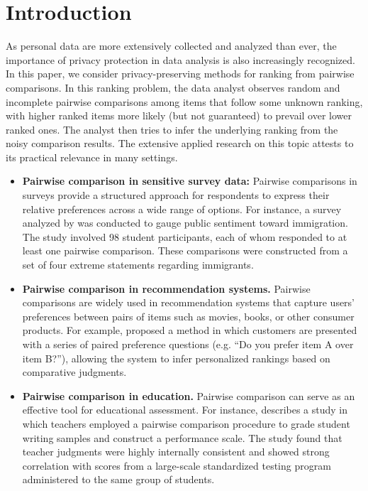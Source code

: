 \documentclass[letterpaper,12pt]{article}
\numberwithin{equation}{section}
\theoremstyle{plain}
\numberwithin{Theorem}{section}
\numberwithin{corollary}{section}
\numberwithin{proposition}{section}
\numberwithin{Lemma}{section}
{
	\theoremstyle{definition}
	\newtheorem{Definition}{Definition}
	\newtheorem{example}{Example}
	\numberwithin{example}{section}
	\newtheorem{fact}{Fact}
	\numberwithin{fact}{section}
	\newtheorem{remark}{Remark}
}
\newcommand{\1}{\mathbbm{1}}
\begin{document}
\section{Introduction} 
As personal data are more extensively collected and analyzed than ever, the importance of privacy protection in data analysis is also increasingly recognized. In this paper, we consider privacy-preserving methods for ranking from pairwise comparisons. In this ranking problem, the data analyst observes random and incomplete pairwise comparisons among items that follow some unknown ranking, with higher ranked items more likely (but not guaranteed) to prevail over lower ranked ones. The analyst then tries to infer the underlying ranking from the noisy comparison results. The extensive applied research on this topic attests to its practical relevance in many settings.
\begin{itemize}
	
	\item \textbf{Pairwise comparison in sensitive survey data:} Pairwise comparisons in surveys provide a structured approach for respondents to express their relative preferences across a wide range of options. For instance, a survey analyzed by \cite{weber2011novel} was conducted to gauge public sentiment toward immigration. The study involved 98 student participants, each of whom responded to at least one pairwise comparison. These comparisons were constructed from a set of four extreme statements regarding immigrants.
		
	\item \textbf{Pairwise comparison in recommendation systems.} Pairwise comparisons are widely used in recommendation systems that capture users' preferences between pairs of items such as movies, books, or other consumer products. For example, \cite{balakrishnan2012two} proposed a method in which customers are presented with a series of paired preference questions (e.g. ``Do you prefer item A over item B?''), allowing the system to infer personalized rankings based on comparative judgments.
	
	\item \textbf{Pairwise comparison in education.} Pairwise comparison can serve as an effective tool for educational assessment. For instance, \cite{heldsinger2010using} describes a study in which teachers employed a pairwise comparison procedure to grade student writing samples and construct a performance scale. The study found that teacher judgments were highly internally consistent and showed strong correlation with scores from a large-scale standardized testing program administered to the same group of students.	
\end{itemize}
\end{document}
